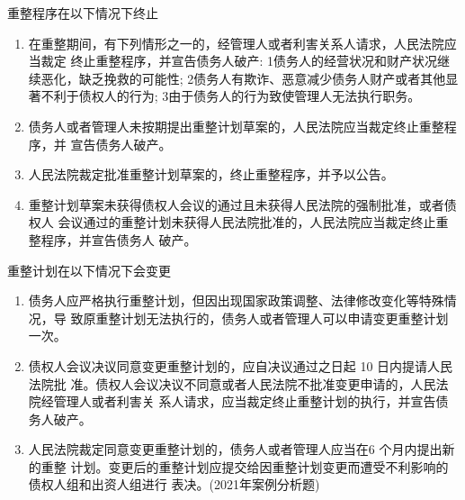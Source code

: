 \documentclass[UTF8,12pt]{ctexart}
\numberwithin{equation}{section} %
\numberwithin{figure}{section}
\numberwithin{table}{section}
\begin{document}
	重整程序在以下情况下终止
	\begin{enumerate}
		\item 在重整期间，有下列情形之一的，经管理人或者利害关系人请求，人民法院应当裁定 终止重整程序，并宣告债务人破产: 1债务人的经营状况和财产状况继续恶化，缺乏挽救的可能性; 2债务人有欺诈、恶意减少债务人财产或者其他显著不利于债权人的行为; 3由于债务人的行为致使管理人无法执行职务。 
		
		\item 债务人或者管理人未按期提出重整计划草案的，人民法院应当裁定终止重整程序，并 宣告债务人破产。
		
		\item 人民法院裁定批准重整计划草案的，终止重整程序，并予以公告。
		
		\item 重整计划草案未获得债权人会议的通过且未获得人民法院的强制批准，或者债权人 会议通过的重整计划未获得人民法院批准的，人民法院应当裁定终止重整程序，并宣告债务人 破产。
		
	\end{enumerate}
	
	重整计划在以下情况下会变更
	\begin{enumerate}
		\item  债务人应严格执行重整计划，但因出现国家政策调整、法律修改变化等特殊情况，导 致原重整计划无法执行的，债务人或者管理人可以申请变更重整计划 一次。
		
		\item 债权人会议决议同意变更重整计划的，应自决议通过之日起 10 日内提请人民法院批 准。债权人会议决议不同意或者人民法院不批准变更申请的，人民法院经管理人或者利害关 系人请求，应当裁定终止重整计划的执行，并宣告债务人破产。
		
		\item 人民法院裁定同意变更重整计划的，债务人或者管理人应当在6 个月内提出新的重整 计划。变更后的重整计划应提交给因重整计划变更而遭受不利影响的债权人组和出资人组进行 表决。(2021年案例分析题)
	\end{enumerate}
	
\end{document}
